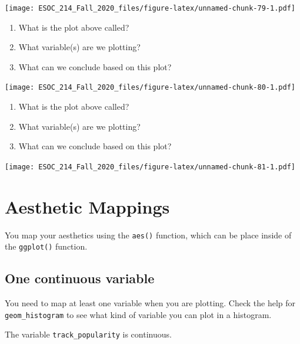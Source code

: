 \documentclass[
]{book}
\newenvironment{Shaded}{\begin{snugshade}}{\end{snugshade}}
\newcommand{\DataTypeTok}[1]{\textcolor[rgb]{0.13,0.29,0.53}{#1}}
\newcommand{\KeywordTok}[1]{\textcolor[rgb]{0.13,0.29,0.53}{\textbf{#1}}}
\newcommand{\NormalTok}[1]{#1}
\newcommand{\OperatorTok}[1]{\textcolor[rgb]{0.81,0.36,0.00}{\textbf{#1}}}
\newcommand{\StringTok}[1]{\textcolor[rgb]{0.31,0.60,0.02}{#1}}
\begin{document}
\texttt{[image: ESOC\_214\_Fall\_2020\_files/figure-latex/unnamed-chunk-79-1.pdf]}

\begin{enumerate}
\def\labelenumi{\arabic{enumi})}
\item
  What is the plot above called?
\item
  What variable(s) are we plotting?
\item
  What can we conclude based on this plot?
\end{enumerate}

\texttt{[image: ESOC\_214\_Fall\_2020\_files/figure-latex/unnamed-chunk-80-1.pdf]}

\begin{enumerate}
\def\labelenumi{\arabic{enumi})}
\item
  What is the plot above called?
\item
  What variable(s) are we plotting?
\item
  What can we conclude based on this plot?
\end{enumerate}

\texttt{[image: ESOC\_214\_Fall\_2020\_files/figure-latex/unnamed-chunk-81-1.pdf]}

\hypertarget{aesthetic-mappings}{%
\section{Aesthetic Mappings}\label{aesthetic-mappings}}

You map your aesthetics using the \texttt{aes()} function, which can be place inside of the \texttt{ggplot()} function.

\hypertarget{one-continuous-variable}{%
\subsection{One continuous variable}\label{one-continuous-variable}}

You need to map at least one variable when you are plotting. Check the help for \texttt{geom\_histogram} to see what kind of variable you can plot in a histogram.

The variable \texttt{track\_popularity} is continuous.

\begin{Shaded}
\end{Shaded}
\end{document}

